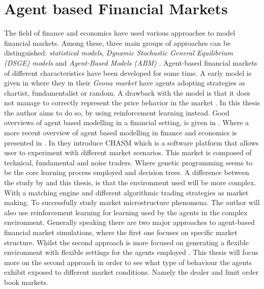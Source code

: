 \documentclass{kththesis}
\theoremstyle{definition}
\begin{document}
\section{Agent based Financial Markets}
The field of finance and economics have used various approaches to model financial markets. Among these, three main groups of approaches can be distinguished: \textit{statistical models}, \textit{Dynamic Stochastic General Equilibrium (DSGE) models} and \textit{Agent-Based Models (ABM)} \parencite{lussange2018bright}. Agent-based financial markets of different characteristics have been developed for some time. A early model is given in \parencite{raberto2001agent} where they in their \textit{Geona market} have agents adopting strategies as chartist, fundamentalist or random. A drawback with the model is that it does not manage to correctly represent the price behavior in the market \parencite{raberto2001agent}. In this thesis the author aims to do so, by using reinforcement learning instead. 
\newline
\newline
Good overviews of agent based modelling in a financial setting, is given in \parencite{martinez2009evolutionary, boer2008agent, lebaron2006agent}. Where a more recent overview of agent based modelling in finance and economics is presented in \parencite{lussange2018bright}. In \textcite{martinez2009evolutionary} they introduce CHASM which is a software platform that allows user to experiment with different market scenarios. This market is composed of technical, fundamental and noise traders. 
\newpage
Where genetic programming seems to be the core learning process employed and decision trees. A difference between the study by \textcite{martinez2009evolutionary} and this thesis, is that the environment used will be more complex. With a matching engine and different algorithmic trading strategies as market making. To successfully study market microstructure phenomena. The author will also use reinforcement learning for learning used by the agents in the complex environment. Generally speaking there are two major approaches to agent-based financial market simulations, where the first one focuses on specific market structure. Whilst the second approach is more focused on generating a flexible environment with flexible settings for the agents employed \parencite{brandouy2011design}. This thesis will focus more on the second approach in order to see what type of behaviour the agents exhibit exposed to different market conditions. Namely the dealer and limit order book markets. 
\newline
\end{document}
